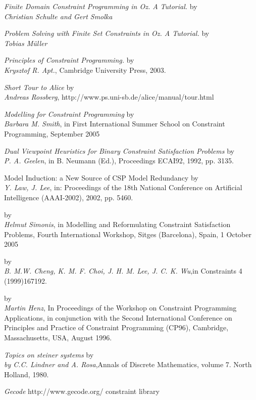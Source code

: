 \documentclass[a4paper]{scrartcl}
\begin{document}
\newpage

\begin{thebibliography}{99}
 {\it Finite Domain Constraint Programming in Oz. A Tutorial.} by \\ 
{\it Christian Schulte and Gert Smolka}

 {\it Problem Solving with Finite Set Constraints in Oz. A Tutorial.} by \\ 
{\it Tobias M\"uller}

 {\it Principles of Constraint Programming.} by \\
 {\it Krysztof R. Apt.}, Cambridge University Press, 2003.

 {\it Short Tour to Alice} by\\
{\it Andreas Rossberg}, http://www.ps.uni-sb.de/alice/manual/tour.html

 {\it Modelling for Constraint Programming} by\\
{\it Barbara M. Smith}, in First International Summer School
on Constraint Programming, September 2005

 {\it Dual Viewpoint Heuristics for Binary
Constraint Satisfaction Problems} by \\ 
{\it P. A. Geelen}, in B. Neumann
(Ed.), Proceedings ECAI92, 1992, pp. 3135. 

  {Model Induction: a New Source
of CSP Model Redundancy} by \\
{\it Y. Law, J. Lee}, in: Proceedings of the
18th National Conference on Artificial Intelligence
(AAAI-2002), 2002, pp. 5460.

 by\\
{\it Helmut Simonis}, in Modelling and Reformulating
Constraint Satisfaction Problems, Fourth International Workshop,
Sitges (Barcelona), Spain, 1 October 2005

 by\\
{\it B. M.W. Cheng, K. M. F. Choi, J. H. M. Lee, J. C. K. Wu},in 
Constraints 4 (1999)167192.

 by\\
{\it  Martin Henz}, In Proceedings of the Workshop on Constraint 
Programming 
Applications, in conjunction with the Second International 
Conference on Principles 
and Practice of Constraint Programming (CP96), Cambridge, 
Massachusetts, USA, August 1996.

 {\it Topics on steiner systems} by \\ 
{\it by C.C. Lindner and A. Rosa},Annals of Discrete Mathematics, 
volume 7. North Holland, 1980.

\htmladdnormallink
{\it Gecode}
{http://www.gecode.org/} constraint library

\end{thebibliography}
\end{document}
